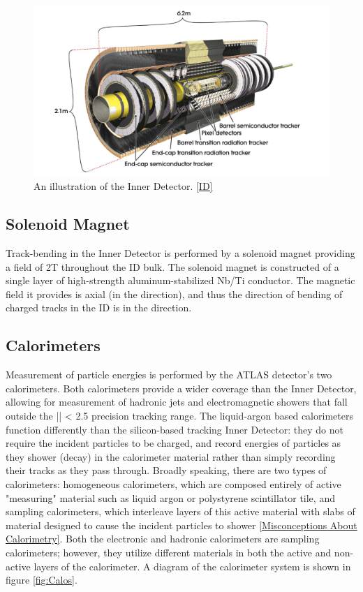 \begin{figure}
  \includegraphics[width=\linewidth]{figures/detector_chapter/ID.png}
  \caption{An illustration of the Inner Detector. \ref{ID}}
  \label{fig:ID}
\end{figure}

\subsection{Solenoid Magnet} \label{sec:solenoid}

Track-bending in the Inner Detector is performed by a solenoid magnet providing a field of 2T throughout the ID bulk. The solenoid magnet is constructed of a single layer of high-strength aluminum-stabilized Nb/Ti conductor. The magnetic field it provides is axial (in the \z direction), and thus the direction of bending of charged tracks in the ID is in the \phi direction. 

\subsection{Calorimeters} \label{sec:Calos} 

Measurement of particle energies is performed by the ATLAS detector's two calorimeters. Both calorimeters provide a wider \eta coverage than the Inner Detector, allowing for measurement of hadronic jets and electromagnetic showers that fall outside the |\eta| < 2.5 precision tracking range. The liquid-argon based calorimeters function differently than the silicon-based tracking Inner Detector: they do not require the incident particles to be charged, and record energies of particles as they shower (decay) in the calorimeter material rather than simply recording their tracks as they pass through. Broadly speaking, there are two types of calorimeters: homogeneous calorimeters, which are composed entirely of active "measuring" material such as liquid argon or polystyrene scintillator tile, and sampling calorimeters, which interleave layers of this active material with slabs of material designed to cause the incident particles to shower \ref{Misconceptions About Calorimetry}. Both the electronic and hadronic calorimeters are sampling calorimeters; however, they utilize different materials in both the active and non-active layers of the calorimeter. A diagram of the calorimeter system is shown in figure \ref{fig:Calos}.

